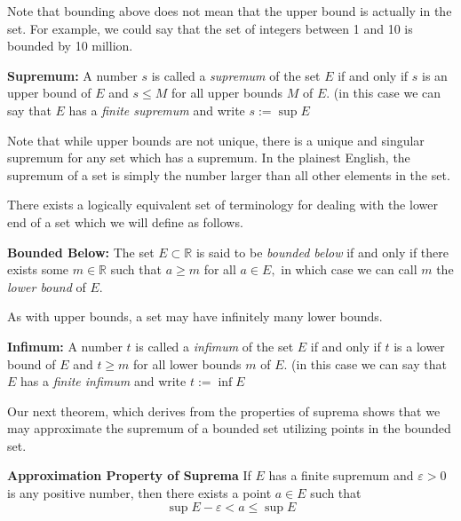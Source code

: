 Note that bounding above does not mean that the upper bound is actually in the set. For example, we could say that the set of integers between 1 and 10 is bounded by 10 million. 

\begin{definition}
\textbf{Supremum:} A number $s$ is called a \emph{supremum} of the set $E$ if and only if $s$ is an upper bound of $E$ and $s \leq M$ for all upper bounds $M$ of $E.$ (in this case we can say that $E$ has a \emph{finite supremum} and write $s:= \sup E$
\end{definition}

Note that while upper bounds are not unique, there is a unique and singular supremum for any set which has a supremum. In the plainest English, the supremum of a set is simply the number larger than all other elements in the set.\newline

There exists a logically equivalent set of terminology for dealing with the lower end of a set which we will define as follows.

\begin{definition}
\textbf{Bounded Below:} The set $E\subset \mathbb{R}$ is said to be \emph{bounded below} if and only if there exists some $m \in \mathbb{R}$ such that $a\geq m$ for all $a\in E,$ in which case we can call $m$ the \emph{lower bound} of $E.$
\end{definition}

As with upper bounds, a set may have infinitely many lower bounds.

\begin{definition}
\textbf{Infimum:} A number $t$ is called a \emph{infimum} of the set $E$ if and only if $t$ is a lower bound of $E$ and $t \geq m$ for all lower bounds $m$ of $E.$ (in this case we can say that $E$ has a \emph{finite infimum} and write $t:= \inf E$
\end{definition}

Our next theorem, which derives from the properties of suprema shows that we may approximate the supremum of a bounded set utilizing points in the bounded set.

\begin{theorem} \textbf{Approximation Property of Suprema}\newline
If $E$ has a finite supremum and $\varepsilon > 0$ is any positive number, then there exists a point $a \in E$ such that $$\sup E - \varepsilon < a \leq \sup E$$
\end{theorem}

